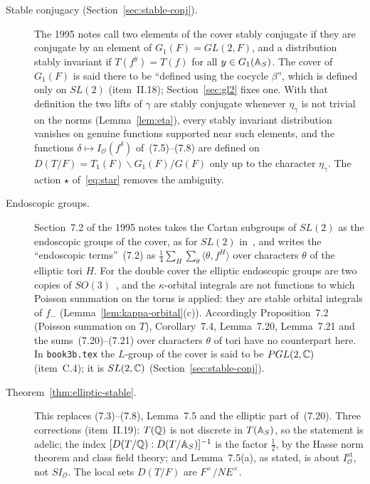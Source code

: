 \begin{description}
\item[Stable conjugacy (Section~\ref{sec:stable-conj}).] The 1995 notes call two elements of the cover stably conjugate if they are conjugate by an element of $G_1(F)=GL(2,F)$, and a distribution stably invariant if $T(f^y)=T(f)$ for all $y\in G_1(\mathbb{A}_S)$. The cover of $G_1(F)$ is said there to be ``defined using the cocycle $\beta$'', which is defined only on $SL(2)$ (item~II.18); Section~\ref{sec:gl2} fixes one. With that definition the two lifts of $\gamma$ are stably conjugate whenever $\eta_\gamma$ is not trivial on the norms (Lemma~\ref{lem:eta}), every stably invariant distribution vanishes on genuine functions supported near such elements, and the functions $\delta\mapsto I_{\mathcal O}(f^\delta)$ of~(7.5)--(7.8) are defined on $D(T/F)=T_1(F)\backslash G_1(F)/G(F)$ only up to the character $\eta_\gamma$. The action $\star$ of~\eqref{eq:star} removes the ambiguity.

\item[Endoscopic groups.] Section~7.2 of the 1995 notes takes the Cartan subgroups of $SL(2)$ as the endoscopic groups of the cover, as for $SL(2)$ in~\cite{LL}, and writes the ``endoscopic terms''~(7.2) as $\frac14\sum_H\sum_\theta\langle\theta,f^H\rangle$ over characters $\theta$ of the elliptic tori $H$. For the double cover the elliptic endoscopic groups are two copies of $SO(3)$~\cite{Li11}, and the $\kappa$-orbital integrals are not functions to which Poisson summation on the torus is applied: they are stable orbital integrals of $f_-$ (Lemma~\ref{lem:kappa-orbital}(c)). Accordingly Proposition~7.2 (Poisson summation on $T$), Corollary~7.4, Lemma~7.20, Lemma~7.21 and the sums~(7.20)--(7.21) over characters $\theta$ of tori have no counterpart here. In \texttt{book3b.tex} the $L$-group of the cover is said to be $PGL(2,\mathbb{C})$ (item~C.4); it is $SL(2,\mathbb{C})$ (Section~\ref{sec:stable-conj}).

\item[Theorem~\ref{thm:elliptic-stable}.] This replaces (7.3)--(7.8), Lemma~7.5 and the elliptic part of~(7.20). Three corrections (item~II.19): $T(\mathbb{Q})$ is not discrete in $T(\mathbb{A}_S)$, so the statement is adelic; the index $[D(T/\mathbb{Q}):D(T/\mathbb{A}_S)]^{-1}$ is the factor $\frac12$, by the Hasse norm theorem and class field theory; and Lemma~7.5(a), as stated, is about $I^{\mathrm{st}}_{\mathcal O}$, not $SI_{\mathcal O}$. The local sets $D(T/F)$ are $F^\times/N E^\times$.


\end{description}
